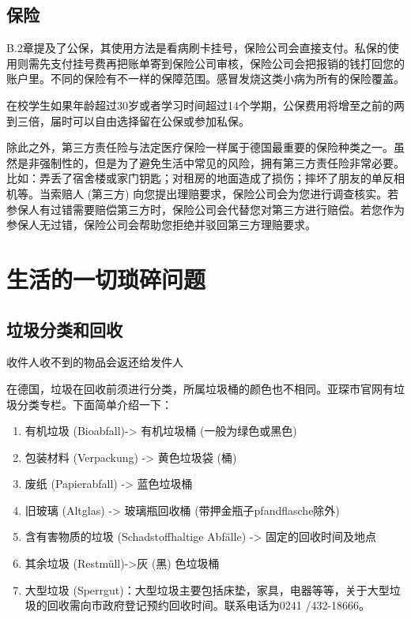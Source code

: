   \subsection{保险}\label{subsec:保险}

    B.2章提及了公保，其使用方法是看病刷卡挂号，保险公司会直接支付。私保的使用则需先支付挂号费再把账单寄到保险公司审核，保险公司会把报销的钱打回您的账户里。不同的保险有不一样的保障范围。感冒发烧这类小病为所有的保险覆盖。

    在校学生如果年龄超过30岁或者学习时间超过14个学期，公保费用将增至之前的两到三倍，届时可以自由选择留在公保或参加私保。

    除此之外，第三方责任险与法定医疗保险一样属于德国最重要的保险种类之一。虽然是非强制性的，但是为了避免生活中常见的风险，拥有第三方责任险非常必要。比如：弄丢了宿舍楼或家门钥匙；对租房的地面造成了损伤；摔坏了朋友的单反相机等。当索赔人 (第三方) 向您提出理赔要求，保险公司会为您进行调查核实。若参保人有过错需要赔偿第三方时，保险公司会代替您对第三方进行赔偿。若您作为参保人无过错，保险公司会帮助您拒绝并驳回第三方理赔要求。

\section{生活的一切琐碎问题}\label{sec:生活的一切琐碎问题}

  \subsection{垃圾分类和回收}\label{subsec:垃圾分类和回收}

    收件人收不到的物品会返还给发件人

    在德国，垃圾在回收前须进行分类，所属垃圾桶的颜色也不相同。亚琛市官网有垃圾分类专栏。下面简单介绍一下：

    \begin{enumerate}
      \item 有机垃圾 (Bioabfall)-> 有机垃圾桶 (一般为绿色或黑色)
      \item 包装材料 (Verpackung) -> 黄色垃圾袋 (桶)
      \item 废纸 (Papierabfall) -> 蓝色垃圾桶
      \item 旧玻璃 (Altglas) -> 玻璃瓶回收桶 (带押金瓶子pfandflasche除外)
      \item 含有害物质的垃圾 (Schadstoffhaltige Abfälle) -> 固定的回收时间及地点
      \item 其余垃圾 (Restmüll)->灰 (黑) 色垃圾桶
      \item 大型垃圾 (Sperrgut)：大型垃圾主要包括床垫，家具，电器等等，关于大型垃圾的回收需向市政府登记预约回收时间。联系电话为0241 /432-18666。
    \end{enumerate}

